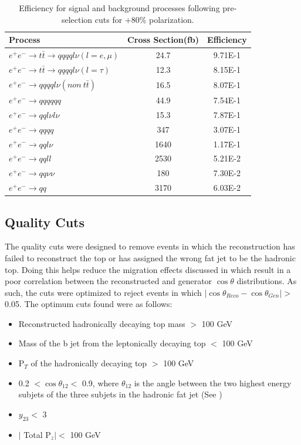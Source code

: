 \begin{table}
  \centering
  \begin{tabular}{l | c | c }
    \toprule
    Process     & Cross Section(fb) & Efficiency \\
    \midrule
     $e^+e^-\rightarrow t\bar{t} \rightarrow qqqql\nu (l=e,\mu)$& 24.7 & 9.71E-1\\
    \midrule
    $e^+e^-\rightarrow t\bar{t} \rightarrow qqqql\nu (l=\tau)$& 12.3 & 8.15E-1\\
    \midrule
    $e^+e^-\rightarrow qqqql\nu (non ~ t\bar{t})$& 16.5 & 8.07E-1\\
    \midrule
    $e^+e^-\rightarrow qqqqqq$ & 44.9 &  7.54E-1\\
    \midrule
    $e^+e^-\rightarrow qql\nu l\nu$ & 15.3  & 7.87E-1\\
    \midrule
    $e^+e^-\rightarrow qqqq$ & 347 &  3.07E-1\\
    \midrule
    $e^+e^-\rightarrow qql\nu$ & 1640 &  1.17E-1\\
    \midrule
    $e^+e^-\rightarrow qqll$ & 2530 &  5.21E-2\\
    \midrule
    $e^+e^-\rightarrow qq\nu\nu$ & 180 & 7.30E-2 \\
    \midrule
    $e^+e^-\rightarrow qq$ & 3170 & 6.03E-2 \\
    \bottomrule
  \end{tabular}
  \caption{Efficiency for signal and background processes following pre-selection cuts for +80\% polarization.}
  \label{table:toppreselpos}
\end{table}

\subsection{Quality Cuts}
\label{Quality Cuts}

The quality cuts were designed to remove events in which the reconstruction has failed to reconstruct the top or has assigned the wrong fat jet to be the hadronic top. Doing this helps reduce the migration effects discussed in  which result in a poor correlation between the reconstructed and generator $\cos\theta$ distributions. As such, the cuts were optimized to reject events in which $|\cos\theta_{Reco}-\cos\theta_{Gen}| > $ 0.05. The optimum cuts found were as follows:

\begin{itemize}
\item Reconstructed hadronically decaying top mass $>$ 100 GeV
\item Mass of the b jet from the leptonically decaying top $<$ 100 GeV
\item P$_T$ of the hadronically decaying top $>$ 100 GeV
\item 0.2 $< \cos\theta_{12} <$ 0.9, where $\theta_{12}$ is the angle between the two highest energy subjets of the three subjets in the hadronic fat jet (See )
\item $y_{23} <$ 3
\item $\mid$ Total P$_z \mid <$ 100 GeV
\end{itemize}

